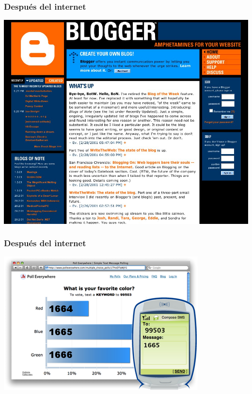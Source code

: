 \documentclass{beamer}
\begin{document}
\begin{frame}
	\frametitle{Después del internet}

	\begin{center}
		\includegraphics[width=.9\textwidth]{figures/blogger.jpeg}
	\end{center}
\end{frame}

\begin{frame}
	\frametitle{Después del internet}

	\begin{center}
		\includegraphics[width=.9\textwidth]{figures/poll_everywhere.png}
	\end{center}
\end{frame}
\end{document}
